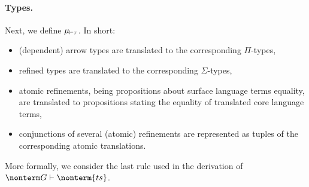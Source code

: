 \documentclass[a4paper]{article}
\begin{document}
\paragraph{Types.}
Next, we define $\mu_{\vdash\tau}$. In short:
\begin{itemize}
  \item (dependent) arrow types are translated to the corresponding $\Pi$-types,
  \item refined types are translated to the corresponding $\Sigma$-types,
  \item atomic refinements, being propositions about surface language terms equality,
    are translated to propositions stating the equality of translated core language terms,
  \item conjunctions of several (atomic) refinements are represented as tuples of the corresponding atomic translations.
\end{itemize}

More formally, we consider the last rule used in the derivation of $\nonterm G \vdash \nonterm{ts}$.
\end{document}
